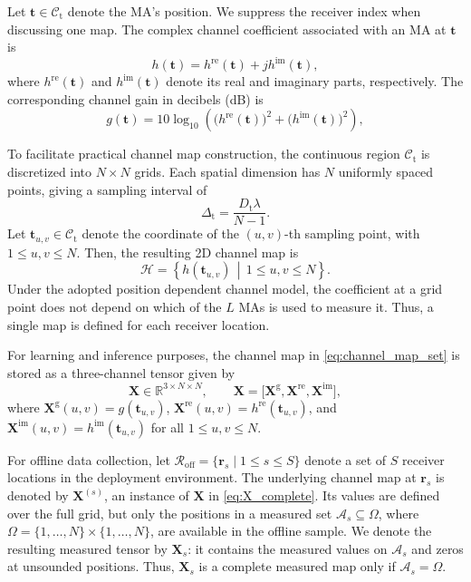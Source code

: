 \documentclass[lettersize,journal]{IEEEtran}
\newcommand{\vect}[1]{\boldsymbol{#1}}
\newcommand{\mat}[1]{\mathbf{#1}}
\newcommand{\R}{\mathbb{R}}
\begin{document}
Let $\vect{t}\in\mathcal{C}_{\mathrm t}$ denote the MA's position. We suppress the receiver index when discussing one map. The complex channel coefficient associated with an MA at $\vect{t}$ is
\begin{equation}
    h(\vect{t})=h^{\mathrm{re}}(\vect{t})+j h^{\mathrm{im}}(\vect{t}),
    \label{eq:continuous_channel_t}
\end{equation}
where $h^{\mathrm{re}}(\vect{t})$ and $h^{\mathrm{im}}(\vect{t})$ denote its real and imaginary parts, respectively. The corresponding channel gain in decibels (dB) is
\begin{equation}
    g(\vect{t})=10\log_{10}\!\left(\big(h^{\mathrm{re}}(\vect{t})\big)^2+\big(h^{\mathrm{im}}(\vect{t})\big)^2\right),
    \label{eq:continuous_gain_t}
\end{equation}

To facilitate practical channel map construction, the continuous region $\mathcal{C}_{\mathrm t}$ is discretized into $N\times N$ grids. Each spatial dimension has $N$ uniformly spaced points, giving a sampling interval of
\begin{equation}
    \Delta_{\mathrm t}=\frac{D_{\mathrm t}\lambda}{N-1}.
    \label{eq:grid_spacing}
\end{equation}
Let $\vect{t}_{u,v}\in\mathcal{C}_{\mathrm t}$ denote the coordinate of the $(u,v)$-th sampling point, with $1\le u,v\le N$. Then, the resulting 2D channel map is
\begin{equation}
    \mathcal{H}=\left\{h(\vect{t}_{u,v})\,\middle|\,1\le u,v\le N\right\}.
    \label{eq:channel_map_set}
\end{equation}
Under the adopted position dependent channel model, the coefficient at a grid point does not depend on which of the $L$ MAs is used to measure it. Thus, a single map is defined for each receiver location.

For learning and inference purposes, the channel map in \eqref{eq:channel_map_set} is stored as a three-channel tensor given by
\begin{equation}
    \mat{X}\in\R^{3\times N\times N},
    \qquad
    \mat{X}=\big[\mat{X}^{\mathrm g},\mat{X}^{\mathrm{re}},\mat{X}^{\mathrm{im}}\big],
    \label{eq:X_complete}
\end{equation}
where $\mat{X}^{\mathrm g}(u,v)=g(\vect{t}_{u,v})$, $\mat{X}^{\mathrm{re}}(u,v)=h^{\mathrm{re}}(\vect{t}_{u,v})$, and $\mat{X}^{\mathrm{im}}(u,v)=h^{\mathrm{im}}(\vect{t}_{u,v})$ for all $1\le u,v\le N$.

For offline data collection, let $\mathcal{R}_{\mathrm{off}}=\{\vect{r}_s\mid 1\le s\le S\}$ denote a set of $S$ receiver locations in the deployment environment. The underlying channel map at $\vect{r}_s$ is denoted by $\mat{X}^{(s)}$, an instance of $\mat{X}$ in \eqref{eq:X_complete}. Its values are defined over the full grid, but only the positions in a measured set $\mathcal{A}_s\subseteq\Omega$, where $\Omega=\{1,\ldots,N\}\times\{1,\ldots,N\}$, are available in the offline sample. We denote the resulting measured tensor by $\mat{X}_s$: it contains the measured values on $\mathcal{A}_s$ and zeros at unsounded positions. Thus, $\mat{X}_s$ is a complete measured map only if $\mathcal{A}_s=\Omega$.
\end{document}

